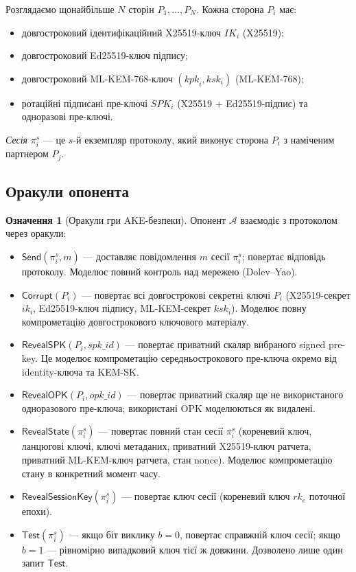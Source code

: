 \documentclass[11pt,a4paper]{article}
\theoremstyle{definition}
\newtheorem{definition}[theorem]{Означення}
\newcommand{\advA}{\ensuremath{\mathcal{A}}}
\renewcommand{\DH}{\textsf{X25519}}
\newcommand{\KEM}{\textsf{ML-KEM-768}}
\newcommand{\rk}{\ensuremath{\mathit{rk}}}
\newcommand{\IK}{\ensuremath{\mathit{IK}}}
\newcommand{\SPK}{\ensuremath{\mathit{SPK}}}
\begin{document}
Розглядаємо щонайбільше $N$ сторін $P_1, \ldots, P_N$. Кожна
сторона $P_i$ має:
\begin{itemize}
  \item довгостроковий ідентифікаційний \DH{}-ключ $\IK_i$ (X25519);
  \item довгостроковий Ed25519-ключ підпису;
  \item довгостроковий \KEM{}-ключ $(\mathit{kpk}_i, \mathit{ksk}_i)$
    (ML-KEM-768);
  \item ротаційні підписані пре-ключі $\SPK_i$ (X25519 + Ed25519-підпис)
    та одноразові пре-ключі.
\end{itemize}
\emph{Сесія} $\pi_i^s$ — це $s$-й екземпляр протоколу, який виконує
сторона $P_i$ з наміченим партнером $P_j$.

\subsection{Оракули опонента}\label{sec:oracles}

\begin{definition}[Оракули гри AKE-безпеки]\label{def:oracles}
Опонент $\advA$ взаємодіє з протоколом через оракули:
\begin{itemize}
  \item $\mathsf{Send}(\pi_i^s, m)$ — доставляє повідомлення $m$
    сесії $\pi_i^s$; повертає відповідь протоколу. Моделює повний
    контроль над мережею (Dolev--Yao).
  \item $\mathsf{Corrupt}(P_i)$ — повертає всі довгострокові секретні
    ключі $P_i$ (X25519-секрет $\mathit{ik}_i$, Ed25519-ключ підпису,
    ML-KEM-секрет $\mathit{ksk}_i$). Моделює повну компрометацію довгострокового
    ключового матеріалу.
  \item $\mathsf{RevealSPK}(P_i,\mathit{spk\_id})$ — повертає приватний
    скаляр вибраного signed pre-key. Це моделює компрометацію
    середньострокового пре-ключа окремо від identity-ключа та KEM-SK.
  \item $\mathsf{RevealOPK}(P_i,\mathit{opk\_id})$ — повертає приватний
    скаляр ще не використаного одноразового пре-ключа; використані OPK
    моделюються як видалені.
  \item $\mathsf{RevealState}(\pi_i^s)$ — повертає повний стан сесії
    $\pi_i^s$ (кореневий ключ, ланцюгові ключі, ключі метаданих,
    приватний \DH{}-ключ ратчета, приватний ML-KEM-ключ ратчета, стан
    nonce). Моделює компрометацію стану в конкретний момент часу.
  \item $\mathsf{RevealSessionKey}(\pi_i^s)$ — повертає ключ сесії
    (кореневий ключ $\rk_e$ поточної епохи).
  \item $\mathsf{Test}(\pi_i^s)$ — якщо біт виклику $b = 0$, повертає
    справжній ключ сесії; якщо $b = 1$ — рівномірно випадковий ключ
    тієї ж довжини. Дозволено лише один запит $\mathsf{Test}$.
\end{itemize}
\end{definition}
\end{document}
